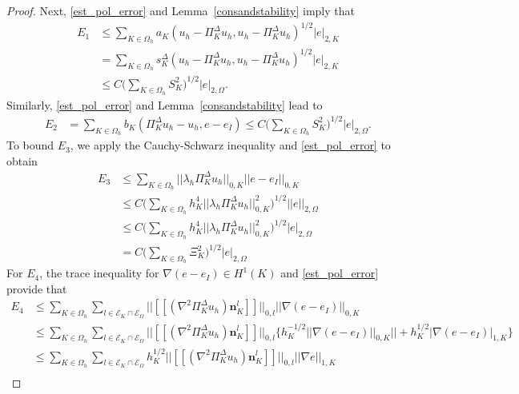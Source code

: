 \documentclass[final,reqno]{elsarticle}
\def\O{\Omega}
\def\PiK{\Pi_{K}^{\Delta}}
\begin{document}
\begin{proof}
Next, \eqref{est_pol_error} and Lemma~\ref{consandstability} imply that 
	\begin{align}
		E_1&\leq \sum\limits_{K\in \Omega_h} a_K(u_h-\PiK u_h,u_h-\PiK u_h)^{1/2}|e|_{2,K}\nonumber\\
		&= \sum\limits_{K\in \Omega_h} s_K^{\Delta}(u_h-\PiK u_h,u_h-\PiK u_h)^{1/2}|e|_{2,K} \nonumber\\
        &\leq  C\Big(\sum\limits_{K\in \Omega_h} S_{K}^2\Big)^{1/2} |e|_{2,\O}.\label{err_ap5}
	\end{align}
Similarly,  \eqref{est_pol_error} and Lemma~\ref{consandstability} lead to
	\begin{align}
	E_2&=\sum\limits_{K\in \Omega_h} b_K(\PiK u_h-u_h,e-e_I)\leq  C\Big(\sum\limits_{K\in \Omega_h} S_{K}^2\Big)^{1/2} |e|_{2,\O}.\label{err_ap6}
	\end{align}
To bound $E_3$, we apply the Cauchy-Schwarz inequality and \eqref{est_pol_error} to obtain 
	\begin{align}
	E_3&\leq  \sum\limits_{K\in \Omega_h} ||\lambda_h\PiK u_h ||_{0,K}||e-e_I||_{0,K}\nonumber\\
		&\leq C\Big( \sum\limits_{K\in \Omega_h} h_K^4||\lambda_h\PiK u_h ||_{0,K}^2 \Big)^{1/2}||e||_{2,\O}\nonumber\\
        &\leq C\Big( \sum\limits_{K\in \Omega_h} h_K^4||\lambda_h\PiK u_h ||_{0,K}^2 \Big)^{1/2}|e|_{2,\O}\nonumber\\
        &=C\Big( \sum\limits_{K\in \Omega_h} \Xi_K^2 \Big)^{1/2}|e|_{2,\O}\label{err_ap7}
	\end{align}
For $E_4$, the trace inequality for $\nabla (e-e_I)\in H^1(K)$ and \eqref{est_pol_error} provide that
	\begin{align}
		E_4&\leq \sum\limits_{K\in \Omega_h}\sum_{l\in \mathcal{E}_K\cap \mathcal{E}_{\O}} \Big|\Big|[\![(\nabla^2\PiK u_h )\boldsymbol{n}_K^l]\!]  \Big|\Big|_{0,l} || \nabla (e-e_I)||_{0,K}\nonumber\\
	&\leq\sum\limits_{K\in \Omega_h} \sum_{l\in \mathcal{E}_K\cap \mathcal{E}_{\O}} \Big|\Big|[\![(\nabla^2\PiK u_h )\boldsymbol{n}_K^l]\!]  \Big|\Big|_{0,l} \Big\{h_K^{-1/2}|| \nabla(e-e_I)||_{0,K} ||+h_K^{1/2}|\nabla(e-e_I)|_{1,K}\Big\}\nonumber\\
		&\leq \sum\limits_{K\in \Omega_h}\sum_{l\in \mathcal{E}_K\cap \mathcal{E}_{\O}} h_K^{1/2}\Big|\Big|[\![(\nabla^2\PiK u_h )\boldsymbol{n}_K^l]\!]  \Big|\Big|_{0,l}||\nabla e||_{1,K}\nonumber\\

\end{align}
\end{proof}
\end{document}
